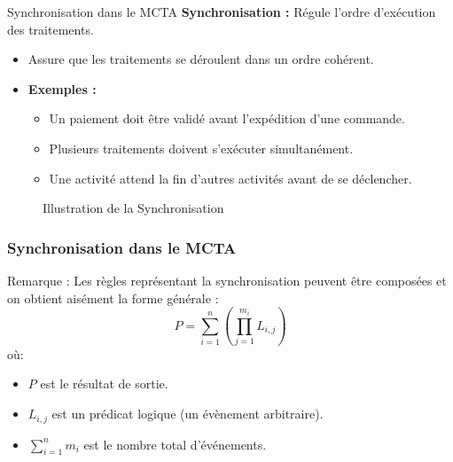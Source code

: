 \documentclass{beamer}
\begin{document}
\begin{frame}{Synchronisation dans le MCTA}
    \textbf{Synchronisation :} Régule l'ordre d'exécution des traitements.
    \begin{itemize}
        \item Assure que les traitements se déroulent dans un ordre cohérent.
        \item \textbf{Exemples :}
        \begin{itemize}
            \item Un paiement doit être validé avant l'expédition d'une commande.
            \item Plusieurs traitements doivent s'exécuter simultanément.
            \item Une activité attend la fin d'autres activités avant de se déclencher.
        \end{itemize}
    \end{itemize}
    \vspace{1em}
    \label{fig6}
    \begin{figure}
        \centering
        \caption{Illustration de la Synchronisation}
    \end{figure}
\end{frame}
\begin{frame}
\frametitle{Synchronisation dans le MCTA}

\begin{alertblock}{Remarque :}
\footnotesize Les règles représentant la synchronisation peuvent être composées et on obtient aisément la forme générale :
\[P = \sum_{i=1}^{n} \left( \prod_{j=1}^{m_i} L_{i,j} \right)\]
où: 
\begin{itemize}
    \item $P$ est le résultat de sortie.
    \item $L_{i,j}$ est un prédicat logique (un évènement arbitraire).
    \item $\sum_{i=1}^{n} m_i$ est le nombre total d'événements.
\end{itemize}
\end{alertblock}
\end{frame}
\end{document}
